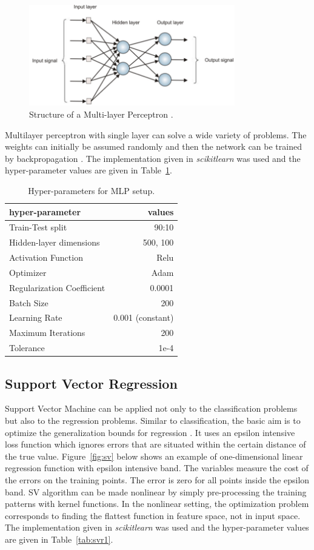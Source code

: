 \begin{figure}
\centering
\includegraphics[width=0.8\textwidth]{nn.png}
\caption{\label{fig:nn}Structure of a Multi-layer Perceptron \cite{nn}.}
\end{figure}

Multilayer perceptron with single layer can solve a wide variety of problems. The weights can initially be assumed randomly and then the network can be trained by backpropagation \cite{bp}. The implementation given in \textit{scikitlearn} was used and the hyper-parameter values are given in Table~\ref{tab:nn1}. 

\begin{table}
\centering
\begin{tabular}{l|r}
hyper-parameter & values \\\hline
Train-Test split & 90:10 \\
Hidden-layer dimensions & 500, 100 \\
Activation Function & Relu \\
Optimizer & Adam \\
Regularization Coefficient & 0.0001 \\
Batch Size & 200 \\
Learning Rate & 0.001 (constant) \\
Maximum Iterations & 200 \\
Tolerance & 1e-4
\end{tabular}
\caption{\label{tab:nn1}Hyper-parameters for MLP setup.}
\end{table}

\subsection{Support Vector Regression}
Support Vector Machine can be applied not only to the classification problems but also to the regression problems. Similar to classification, the basic aim is to optimize the generalization bounds for regression \cite{svr}. It uses an epsilon intensive loss function which ignores errors that are situated within the certain distance of the true value. Figure~\ref{fig:sv} below shows an example of one-dimensional linear regression function with epsilon intensive band. The variables measure the cost of the errors on the training points. The error is zero for all points inside the epsilon band. SV algorithm can be made nonlinear by simply pre-processing the training patterns with kernel functions. In the nonlinear setting, the optimization problem corresponds to finding the flattest function in feature space, not in input space. The implementation given in \textit{scikitlearn} was used and the hyper-parameter values are given in Table~\ref{tab:svr1}.

